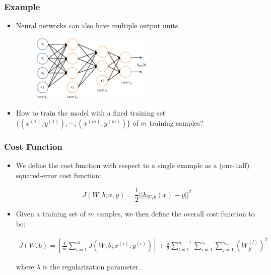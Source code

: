 \documentclass{beamer}
\newcommand{\beq}[1]{\vspace{-0.02in}\begin{equation}#1\end{equation}\vspace{-0.02in}}
\newcommand{\beqn}[1]{\vspace{-0.03in}\begin{eqnarray}#1\end{eqnarray}\vspace{-0.03in}}
\begin{document}
\begin{frame}
\frametitle{Example}
\begin{itemize}
\item Neural networks can also have multiple output units. 

\begin{figure}
      \includegraphics[height=3.2cm]{figs/Network3322.png}
\end{figure}

\item How to train the model with a fixed training set $\{(x^{(1)}, y^{(1)}), \cdots, (x^{(m)}, y^{(m)})\}$ of $m$ training samples?

\end{itemize}
\end{frame}

\begin{frame}
\frametitle{Cost Function}
\begin{itemize}
\item We define the cost function with respect to a single example as a (one-half) squared-error cost function:

\beq{
J(W, b; x, y)=\frac{1}{2}||h_{W,b}(x)-y||^2
}

\item Given a training set of $m$ samples, we then define the overall cost function to be:

\beqn{
J(W, b)=[\frac{1}{m}\sum_{i=1}^{m}J(W, b; x^{(i)}, y^{(i)})]+\frac{\lambda}{2}\sum_{l=1}^{n_l-1}\sum_{i=1}^{s_l}\sum_{j=1}^{s_{l+1}}(W_{ji}^{(l)})^2
}

where $\lambda$ is the regularization parameter. 
\end{itemize}
\end{frame}
\end{document}
